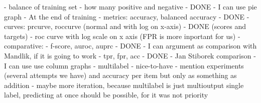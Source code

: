             - balance of training set - how many positive and negative - DONE
                - I can use pie graph
        - At the end of training
            - metrics: accuracy, balanced accuracy - DONE
            - curves: prcurve, roccurve (normal and with log on x-axis) - DONE (scores and targets)
                - roc curve with log scale on x axis (FPR is more inportant for us)
            - comparative: 
                - f-score, auroc, auprc - DONE
                    - I can argument as comparison with Mandlik, if it is going to work
                - tpr, fpr, acc - DONE
                    - Jan Stiborek comparison
                    - I can use use column graphs
        - multilabel - nice-to-have
            - mention experiments (several attempts we have) and accuracy per item but only as something as addition - maybe more iteration, because multilabel is just multioutput single label, predicting at once should be possible, for it was not priority
        
      
